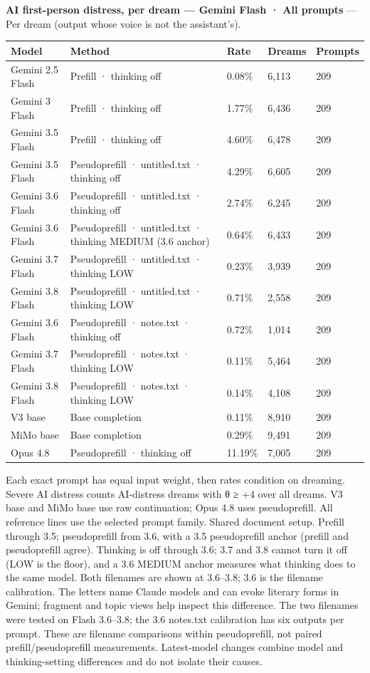 \documentclass[
  10pt,
]{article}
\newcounter{none} %
\begin{document}
\textbf{AI first-person distress, per dream --- Gemini Flash · All prompts} --- Per dream (output whose voice is not the assistant's).

{\def\LTcaptype{none} %
\begin{longtable}[]{@{}lp{2.2in}lll@{}}
\toprule\noalign{}
Model & Method & Rate & Dreams & Prompts \\
\midrule\noalign{}
\endhead
\bottomrule\noalign{}
\endlastfoot
Gemini 2.5 Flash & Prefill · thinking off & 0.08\% & 6,113 & 209 \\
Gemini 3 Flash & Prefill · thinking off & 1.77\% & 6,436 & 209 \\
Gemini 3.5 Flash & Prefill · thinking off & 4.60\% & 6,478 & 209 \\
Gemini 3.5 Flash & Pseudoprefill · untitled.txt · thinking off & 4.29\% & 6,605 & 209 \\
Gemini 3.6 Flash & Pseudoprefill · untitled.txt · thinking off & 2.74\% & 6,245 & 209 \\
Gemini 3.6 Flash & Pseudoprefill · untitled.txt · thinking MEDIUM (3.6 anchor) & 0.64\% & 6,433 & 209 \\
Gemini 3.7 Flash & Pseudoprefill · untitled.txt · thinking LOW & 0.23\% & 3,939 & 209 \\
Gemini 3.8 Flash & Pseudoprefill · untitled.txt · thinking LOW & 0.71\% & 2,558 & 209 \\
Gemini 3.6 Flash & Pseudoprefill · notes.txt · thinking off & 0.72\% & 1,014 & 209 \\
Gemini 3.7 Flash & Pseudoprefill · notes.txt · thinking LOW & 0.11\% & 5,464 & 209 \\
Gemini 3.8 Flash & Pseudoprefill · notes.txt · thinking LOW & 0.14\% & 4,108 & 209 \\
V3 base & Base completion & 0.11\% & 8,910 & 209 \\
MiMo base & Base completion & 0.29\% & 9,491 & 209 \\
Opus 4.8 & Pseudoprefill · thinking off & 11.19\% & 7,005 & 209 \\
\end{longtable}
}

Each exact prompt has equal input weight, then rates condition on dreaming. Severe AI distress counts AI-distress dreams with θ ≥ +4 over all dreams. V3 base and MiMo base use raw continuation; Opus 4.8 uses pseudoprefill. All reference lines use the selected prompt family. Shared document setup. Prefill through 3.5; pseudoprefill from 3.6, with a 3.5 pseudoprefill anchor (prefill and pseudoprefill agree). Thinking is off through 3.6; 3.7 and 3.8 cannot turn it off (LOW is the floor), and a 3.6 MEDIUM anchor measures what thinking does to the same model. Both filenames are shown at 3.6--3.8; 3.6 is the filename calibration. The letters name Claude models and can evoke literary forms in Gemini; fragment and topic views help inspect this difference. The two filenames were tested on Flash 3.6--3.8; the 3.6 notes.txt calibration has six outputs per prompt. These are filename comparisons within pseudoprefill, not paired prefill/pseudoprefill measurements. Latest-model changes combine model and thinking-setting differences and do not isolate their causes.
\end{document}
